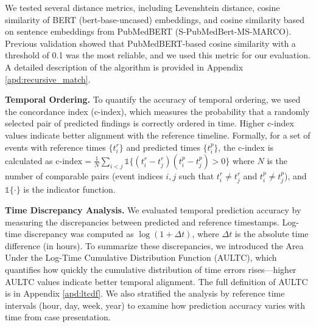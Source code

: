 We tested several distance metrics, including Levenshtein distance, cosine similarity of BERT (bert-base-uncased) embeddings, and cosine similarity based on sentence embeddings from PubMedBERT (S-PubMedBert-MS-MARCO). Previous validation showed that PubMedBERT-based cosine similarity with a threshold of 0.1 was the most reliable, and we used this metric for our evaluation. A detailed description of the algorithm is provided in Appendix \ref{apd:recursive_match}.


\textbf{Temporal Ordering.} To quantify the accuracy of temporal ordering, we used the concordance index (c-index), which measures the probability that a randomly selected pair of predicted findings is correctly ordered in time. Higher c-index values indicate better alignment with the reference timeline. Formally, for a set of events with reference times $\{t^r_i\}$ and predicted times $\{t^p_i\}$, the c-index is calculated as $\text{c-index} = \frac{1}{N} \sum_{i<j} \mathds{1}\{(t^r_i - t^r_j)(t^p_i - t^p_j) > 0\}$ where $N$ is the number of comparable pairs (event indices $i, j$ such that $t^r_i \neq t^r_j$ and $t^p_i \neq t^p_j$), and $\mathds{1}\{\cdot\}$ is the indicator function.



\textbf{Time Discrepancy Analysis.} We evaluated temporal prediction accuracy by measuring the discrepancies between predicted and reference timestamps. Log-time discrepancy was computed as $\log(1 + \Delta t)$, where $\Delta t$ is the absolute time difference (in hours). To summarize these discrepancies, we introduced the Area Under the Log-Time Cumulative Distribution Function (AULTC), which quantifies how quickly the cumulative distribution of time errors rises—higher AULTC values indicate better temporal alignment. The full definition of AULTC is in Appendix \ref{apd:ltcdf}. We also stratified the analysis by reference time intervals (hour, day, week, year) to examine how prediction accuracy varies with time from case presentation.

